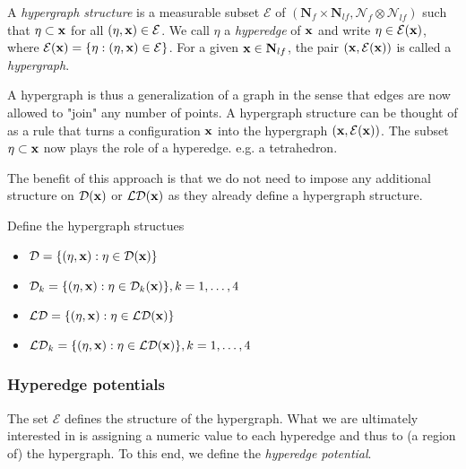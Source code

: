\begin{definition}
	A \textit{hypergraph structure} is a measurable subset $\mathcal E$ of $(\mathbf N_f\times \mathbf N_{lf}, \mathcal N_f \otimes \mathcal N_{lf})$ such that $\eta \subset {\mathbf{x}}$ for all $(\eta,{\mathbf{x}})\in\mathcal E$. We call $\eta$ a \textit{hyperedge} of ${\mathbf{x}}$ and write $\eta \in \mathcal E({\mathbf{x}})$, where $\mathcal E({\mathbf{x}}) = \{\eta: (\eta,{\mathbf{x}}) \in \mathcal E\}$. For a given ${\mathbf{x}} \in \mathbf N_{lf}$, the pair $({\mathbf{x}}, \mathcal E({\mathbf{x}}))$ is called a \textit{hypergraph}.
\end{definition}
A hypergraph is thus a generalization of a graph in the sense that edges are now allowed to "join" any number of points. A hypergraph structure can be thought of as a rule that turns a configuration ${\mathbf{x}}$ into the hypergraph $({\mathbf{x}},\mathcal E({\mathbf{x}}))$. 
The subset $\eta \subset {\mathbf{x}}$ now plays the role of a hyperedge. e.g. a tetrahedron.

The benefit of this approach is that we do not need to impose any additional structure on $\mathcal D({\mathbf{x}})$ or $\mathcal {LD}({\mathbf{x}})$ as they already define a hypergraph structure. 

\begin{definition}
	Define the hypergraph structues
	\begin{itemize}
		\item $\mathcal D = \{(\eta,{\mathbf{x}}): \eta \in \mathcal D({\mathbf{x}})\}$
		\item 	$\mathcal D_k = \{(\eta,{\mathbf{x}}): \eta \in \mathcal D_k({\mathbf{x}})\}, k=1,\dots,4$
		\item 	$\mathcal {LD} = \{(\eta,{\mathbf{x}}): \eta \in \mathcal {LD}({\mathbf{x}})\}$
		\item 	$\mathcal {LD}_k = \{(\eta,{\mathbf{x}}): \eta \in \mathcal {LD}({\mathbf{x}})\}, k=1,\dots,4$
	\end{itemize}
\end{definition}


\subsubsection{Hyperedge potentials}
The set $\mathcal E$ defines the structure of the hypergraph. What we are ultimately interested in is assigning a numeric value to each hyperedge and thus to (a region of) the hypergraph. To this end, we define the \textit{hyperedge potential}.

